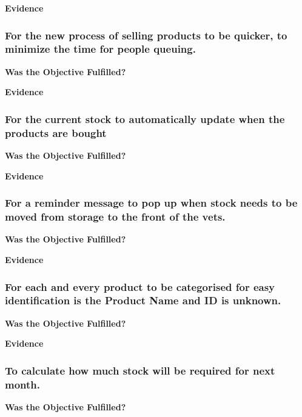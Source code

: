 \textbf{Evidence} \newline




\subsubsection{For the new process of selling products to be quicker, to minimize the time for people queuing.}
\textbf{Was the Objective Fulfilled?} \newline

\textbf{Evidence} \newline




\subsubsection{For the current stock to automatically update when the products are bought}
\textbf{Was the Objective Fulfilled?} \newline

\textbf{Evidence} \newline




\subsubsection{For a reminder message to pop up when stock needs to be moved from storage to the front of the vets. }
\textbf{Was the Objective Fulfilled?} \newline

\textbf{Evidence} \newline




\subsubsection{For each and every product to be categorised for easy identification is the Product Name and ID is unknown.}
\textbf{Was the Objective Fulfilled?} \newline

\textbf{Evidence} \newline





\subsubsection{To calculate how much stock will be required for next month.}
\textbf{Was the Objective Fulfilled?} \newline

